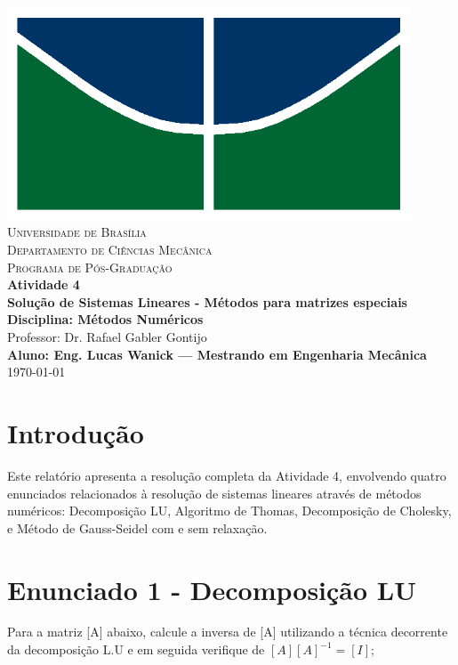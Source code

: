 \documentclass[12pt]{article}
\begin{document}
\begin{titlepage}
    \centering
    \includegraphics[width=12cm]{img/unb_bandeira.png} \\
    \vspace{1cm}
    \textsc{\Large Universidade de Bras\'ilia} \\
    \textsc{Departamento de Ciências Mec\^anica} \\
    \textsc{Programa de P\'os-Gradua\c{c}\~ao} \\
    \vfill
    {\Large\bfseries Atividade 4} \\
    \vspace{0.5cm}
    {\Large\bfseries Solução de Sistemas Lineares - Métodos para matrizes especiais} \\
    \vspace{0.5cm}
    \textbf{Disciplina: M\'etodos Num\'ericos} \\
    Professor: Dr. Rafael Gabler Gontijo \\
    \vfill
    \textbf{Aluno: Eng. Lucas Wanick — Mestrando em Engenharia Mec\^anica} \\
    \vspace{0.5cm}
        \today \\
\end{titlepage}


\section{Introdução}
Este relatório apresenta a resolução completa da Atividade 4, envolvendo quatro enunciados relacionados à resolução de sistemas lineares através de métodos numéricos: Decomposição LU, Algoritmo de Thomas, Decomposição de Cholesky, e Método de Gauss-Seidel com e sem relaxação.

\section{Enunciado 1 - Decomposição LU}
Para a matriz [A] abaixo, calcule a inversa de [A] utilizando a técnica decorrente da decomposição L.U e em seguida verifique de \([A][A]^{-1} = [I]\);
\end{document}
